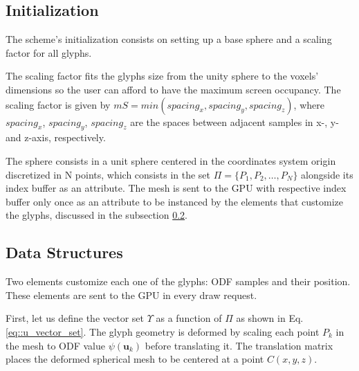 \documentclass[twoside,twocolumn,10pt]{article}
\begin{document}

\subsection{Initialization}
\label{ssec::precomputation}


The scheme's initialization consists on setting up a base sphere and a scaling factor for all glyphs.

The scaling factor fits the glyphs size from the unity sphere to the voxels' dimensions so the user can afford to have the maximum screen occupancy. The scaling factor is given by $mS = min(spacing_x, spacing_y, spacing_z)$, where $spacing_x$, $spacing_y$, $spacing_z$ are the spaces between adjacent samples in x-, y- and z-axis, respectively.

The sphere consists in a unit sphere centered in the coordinates system origin discretized in N points, which consists in the set $\Pi = \{P_1, P_2, \dots, P_N\}$ alongside its index buffer as an attribute. The mesh is sent to the GPU with respective index buffer only once as an attribute to be instanced by the elements that customize the glyphs, discussed in the subsection \ref{ssec::datastruct}.







\subsection{Data Structures}
\label{ssec::datastruct}

Two elements customize each one of the glyphs: ODF samples and their position. These elements are sent to the GPU in every draw request.

First, let us define the vector set $\Upsilon$ as a function of $\Pi$ as shown in Eq. \ref{eq::u_vector_set}. The glyph geometry is deformed by scaling each point $P_k$ in the mesh to ODF value $\psi(\bm{u}_k)$ before translating it. The translation matrix places the deformed spherical mesh to be centered at a point $C(x, y, z)$.
\end{document}
